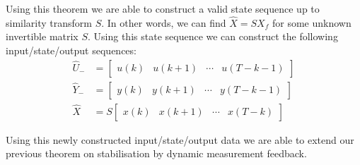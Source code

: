
Using this theorem we are able to construct a valid state sequence up to similarity transform $S$. In other words, we can find $\hat{X} = S X_f$ for some unknown invertible matrix $S$. Using this state sequence we can construct the following input/state/output sequences:
\begin{subequations} \label{StateExtimationData}
	\begin{align*}
		\hat{U}_- &= \begin{bmatrix} u(k) & u(k+1) & \cdots & u(T-k-1) \end{bmatrix} \\
		\hat{Y}_- &= \begin{bmatrix} y(k) & y(k+1) & \cdots & y(T-k-1) \end{bmatrix} \\
		\hat{X} &= S \begin{bmatrix} x(k) & x(k+1) & \cdots & x(T-k) \end{bmatrix} 
	\end{align*}
\end{subequations}


Using this newly constructed input/state/output data we are able to extend our previous theorem on stabilisation by dynamic measurement feedback.

